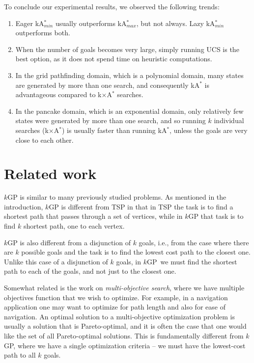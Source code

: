 \documentclass{aicom2e}
\newcommand{\kgs}{$k$GP}
\newcommand{\kastar}{kA$^*$}
\newcommand{\kastarmin}{kA$^*_{min}$}
\newcommand{\kastarmax}{kA$^*_{max}$}
\newcommand{\kxastar}{k$\times$A$^*$}
\begin{document}
To conclude our experimental results, we observed the following trends:
\begin{enumerate}
    \item Eager \kastarmin{} usually outperforms \kastarmax{}, but not always. Lazy \kastarmin{} outperforms both.
    \item When the number of goals becomes very large, simply running UCS is the best option, as it does not spend time on heuristic computations.
    \item In the grid pathfinding domain, which is a polynomial domain, many states are generated by more than one search, and consequently \kastar{} is advantageous compared to \kxastar{} searches.
    \item In the pancake domain, which is an exponential domain,
    only relatively few states were generated by more than one search,
    and so running $k$ individual searches (\kxastar{}) is usually faster than running
    \kastar{}, unless the goals are very close to each other.
\end{enumerate}




\section{Related work}
\label{sec:related-work}

\kgs{} is similar to many previously studied problems. As mentioned in the
introduction, \kgs{} is different from TSP in that in TSP the task is to find a
shortest path that passes through a set of vertices, while in \kgs{} that task
is to find $k$ shortest path, one to each vertex.


\kgs{} is also different from a disjunction of $k$ goals, i.e., from the case
where there are $k$ possible goals and the task is to find the lowest cost path
to the closest one. Unlike this case of a disjunction of $k$ goals, in \kgs\ we
must find the shortest path to each of the goals, and not just to the closest
one.


Somewhat related is the work on {\em multi-objective search}, where we have
multiple objectives function that we wish to optimize. For example, in a
navigation application one may want to optimize for path length and also for
ease of navigation. An optimal solution to a multi-objective optimization
problem is usually a solution that is Pareto-optimal, and it is often the case
that one would like the set of all Pareto-optimal solutions. This is
fundamentally different from \kgs{}, where we have a single optimization
criteria -- we must have the lowest-cost path to all $k$ goals.
\end{document}
